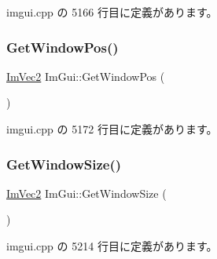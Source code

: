  imgui.\+cpp の 5166 行目に定義があります。

\mbox{\label{namespace_im_gui_a413d939f3ef416a47d6e5b48be955146}} 
\subsubsection{\texorpdfstring{Get\+Window\+Pos()}{GetWindowPos()}}
{\footnotesize\ttfamily \mbox{\hyperlink{struct_im_vec2}{Im\+Vec2}} Im\+Gui\+::\+Get\+Window\+Pos (\begin{DoxyParamCaption}{ }\end{DoxyParamCaption})}



 imgui.\+cpp の 5172 行目に定義があります。

\mbox{\label{namespace_im_gui_aaa5c0bfac7125ba9850a08b6db2e90c9}} 
\subsubsection{\texorpdfstring{Get\+Window\+Size()}{GetWindowSize()}}
{\footnotesize\ttfamily \mbox{\hyperlink{struct_im_vec2}{Im\+Vec2}} Im\+Gui\+::\+Get\+Window\+Size (\begin{DoxyParamCaption}{ }\end{DoxyParamCaption})}



 imgui.\+cpp の 5214 行目に定義があります。

